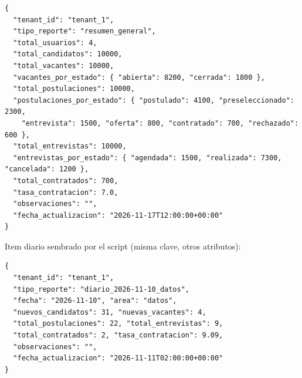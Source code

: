 \begin{lstlisting}
{
  "tenant_id": "tenant_1",
  "tipo_reporte": "resumen_general",
  "total_usuarios": 4,
  "total_candidatos": 10000,
  "total_vacantes": 10000,
  "vacantes_por_estado": { "abierta": 8200, "cerrada": 1800 },
  "total_postulaciones": 10000,
  "postulaciones_por_estado": { "postulado": 4100, "preseleccionado": 2300,
    "entrevista": 1500, "oferta": 800, "contratado": 700, "rechazado": 600 },
  "total_entrevistas": 10000,
  "entrevistas_por_estado": { "agendada": 1500, "realizada": 7300, "cancelada": 1200 },
  "total_contratados": 700,
  "tasa_contratacion": 7.0,
  "observaciones": "",
  "fecha_actualizacion": "2026-11-17T12:00:00+00:00"
}
\end{lstlisting}

Item diario sembrado por el script (misma clave, otros atributos):

\begin{lstlisting}
{
  "tenant_id": "tenant_1",
  "tipo_reporte": "diario_2026-11-10_datos",
  "fecha": "2026-11-10", "area": "datos",
  "nuevos_candidatos": 31, "nuevas_vacantes": 4,
  "total_postulaciones": 22, "total_entrevistas": 9,
  "total_contratados": 2, "tasa_contratacion": 9.09,
  "observaciones": "",
  "fecha_actualizacion": "2026-11-11T02:00:00+00:00"
}
\end{lstlisting}

